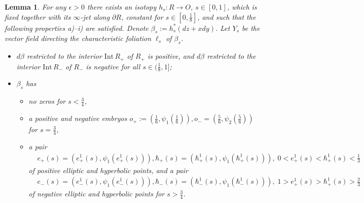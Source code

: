 \documentclass[12pt]{amsart}
\theoremstyle{plain}
\newtheorem{lemma}[theorem]{Lemma}
\theoremstyle{definition}
\theoremstyle{remark}
\newcommand{\eps}{\epsilon}
\newcommand{\p}{\partial}
\newcommand{\Int}{\mathrm{Int\,}}
\begin{document}
\begin{lemma}\label{lm:2d-plug} For any $  \eps>0$
there exists an      isotopy 
$h_s:R\to O$, $s\in[0,1] $, which is fixed together with its $\infty$-jet along $\p R$,   constant for $s\in[0,\frac18]$,  and such that the following properties  a)--i) are satisfied.
Denote $\beta_s:=h_s^* (dz + x dy)$. Let $Y_s$ be the vector field directing the characteristic foliation $\ell_s$ of $\beta_s$.  
\begin{itemize}
   \item[a)] $d\beta$ restricted to the interior $ \Int R_{+}$ of $R_ +$  is positive, and  $ d\beta$ restricted to the interior $\Int R_{-}$ of $R_-$ is negative
for all   $s\in(\frac18,1]$;
\item[b)] $\beta_s$ has
\begin{itemize}
\item no zeros    for $s<\frac34$,
\item  a positive and negative embryos $o_+:=(\frac16,\psi_1(\frac16)),
o_-=(\frac56,\psi_2(\frac56))$ for $s=\frac34$,
 \item a pair 
 \begin{align*}
 &e_+(s)=(e_+^1(s),\psi_1(e_+^1(s))), \hbar_+(s)=(\hbar_+^1(s),\psi_1(\hbar_+^1(s))),\; 0<e_+^1(s)<\hbar_+^1(s)<\frac13
 \end{align*} of positive elliptic and  hyperbolic   points, and a pair
 \begin{align*}
  &e_-(s)=(e_-^1(s),\psi_1(e_-^1(s))), \hbar_-(s)=(\hbar_-^1(s),\psi_1(\hbar_-^1(s))),\; 1>e_+^1(s)>\hbar_+^1(s)>\frac23
 \end{align*} of negative elliptic and  hyperbolic points for $s>\frac34$.
\end{itemize}
 

\end{itemize}
\end{lemma}
\end{document}

